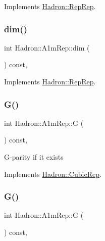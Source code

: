 Implements \mbox{\hyperlink{structHadron_1_1RepRep_a92c8802e5ed7afd7da43ccfd5b7cd92b}{Hadron\+::\+Rep\+Rep}}.

\mbox{\label{structHadron_1_1A1mRep_a475332da370a6a8c6ad3d24cf3f6d38a}} 
\subsubsection{\texorpdfstring{dim()}{dim()}\hspace{0.1cm}{\footnotesize\ttfamily [3/3]}}
{\footnotesize\ttfamily int Hadron\+::\+A1m\+Rep\+::dim (\begin{DoxyParamCaption}{ }\end{DoxyParamCaption}) const\hspace{0.3cm}{\ttfamily [inline]}, {\ttfamily [virtual]}}



Implements \mbox{\hyperlink{structHadron_1_1RepRep_a92c8802e5ed7afd7da43ccfd5b7cd92b}{Hadron\+::\+Rep\+Rep}}.

\mbox{\label{structHadron_1_1A1mRep_ab6bc5137d946f8b3d39d4ff39e92dade}} 
\subsubsection{\texorpdfstring{G()}{G()}\hspace{0.1cm}{\footnotesize\ttfamily [1/2]}}
{\footnotesize\ttfamily int Hadron\+::\+A1m\+Rep\+::G (\begin{DoxyParamCaption}{ }\end{DoxyParamCaption}) const\hspace{0.3cm}{\ttfamily [inline]}, {\ttfamily [virtual]}}

G-\/parity if it exists 

Implements \mbox{\hyperlink{structHadron_1_1CubicRep_a52104e43266d1614c00bbd1c3b395458}{Hadron\+::\+Cubic\+Rep}}.

\mbox{\label{structHadron_1_1A1mRep_ab6bc5137d946f8b3d39d4ff39e92dade}} 
\subsubsection{\texorpdfstring{G()}{G()}\hspace{0.1cm}{\footnotesize\ttfamily [2/2]}}
{\footnotesize\ttfamily int Hadron\+::\+A1m\+Rep\+::G (\begin{DoxyParamCaption}{ }\end{DoxyParamCaption}) const\hspace{0.3cm}{\ttfamily [inline]}, {\ttfamily [virtual]}}

